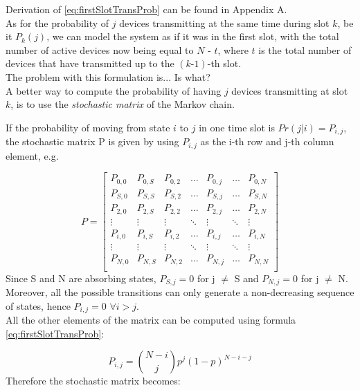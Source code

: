 \noindent Derivation of \ref{eq:firstSlotTransProb} can be found in Appendix A.\\

As for the probability of $j$ devices transmitting at the same time during slot $k$, be it $P_{k}(j)$, we can model the system as if it was in the first slot, with the total number of active devices now being equal to $N$ - $t$, where $t$ is the total number of devices that have transmitted up to the $(k\text{-}1)$-th slot.\\
The problem with this formulation is... Is what? \\

A better way to compute the probability of having $j$ devices transmitting at slot $k$, is to use the \textit{stochastic matrix} of the Markov chain.

If the probability of moving from state $i$ to $j$ in one time slot is $Pr(j|i) = P_{i,j}$, the stochastic matrix P is given by using $P_{i,j}$ as the i-th row and j-th column element, e.g.

\begin{equation*}
P = 
\begin{bmatrix}
P_{0,0}	& P_{0,S}	& P_{0,2}	& \dots  	& P_{0,j}	& \dots		& P_{0,N} \\
P_{S,0}	& P_{S,S}	& P_{S,2}	& \dots  	& P_{S,j}	& \dots		& P_{S,N} \\
P_{2,0}	& P_{2,S}	& P_{2,2}	& \dots  	& P_{2,j}	& \dots		& P_{2,N} \\
\vdots	& \vdots	& \vdots	& \ddots 	& \vdots	& \ddots	& \vdots \\
P_{i,0}	& P_{i,S}	& P_{i,2}	& \dots		& P_{i,j}	& \dots		& P_{i,N} \\
\vdots	& \vdots	& \vdots	& \ddots	& \vdots	& \ddots	& \vdots \\
P_{N,0}	& P_{N,S}	& P_{N,2}	& \dots		& P_{N,j}	& \dots		& P_{N,N} \\
\end{bmatrix}
\label{stochasticMatrix1}
\end{equation*}
\hfill \break
Since S and N are absorbing states, $P_{S,j}=0$ for j $\neq$ S and $P_{N,j}=0$ for j $\neq$ N.\\
Moreover, all the possible transitions can only generate a non-decreasing sequence of states, hence $P_{i, j} = 0 $ $ \forall i > j $.\\
All the other elements of the matrix can be computed using formula \ref{eq:firstSlotTransProb}:

 \begin{equation}
	P_{i,j} = {N-i\choose j} p^{j} (1-p)^{N-i-j}
	\label{eq:matrixElementProb}
\end{equation}
\hfill \break
Therefore the stochastic matrix becomes:

